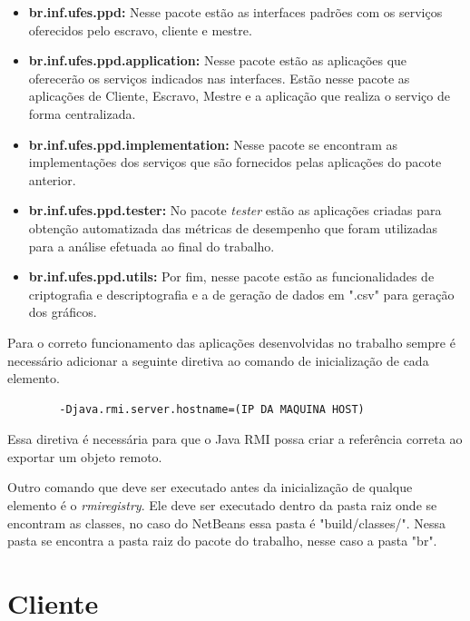 \documentclass[
	12pt,				%
    oneside,			%
	a4paper,			%
	english,			%
	brazil,				%
	]{abntex2}
\begin{document}
\begin{itemize}

	\item \textbf{br.inf.ufes.ppd:} Nesse pacote estão as interfaces padrões com os serviços oferecidos pelo escravo,
	cliente e mestre.
	
	\item \textbf{br.inf.ufes.ppd.application:} Nesse pacote estão as aplicações que oferecerão os serviços indicados nas  
	interfaces. Estão nesse pacote as aplicações de Cliente, Escravo, Mestre e a aplicação que realiza o serviço de forma
	centralizada.

	\item \textbf{br.inf.ufes.ppd.implementation:} Nesse pacote se encontram as implementações dos serviços que são 
	fornecidos pelas aplicações do pacote anterior.
	
	\item \textbf{br.inf.ufes.ppd.tester:} No pacote \textit{tester} estão as aplicações criadas para obtenção automatizada
	das 	métricas de desempenho que foram utilizadas para a análise efetuada ao final do trabalho.
	
	\item \textbf{br.inf.ufes.ppd.utils:} Por fim, nesse pacote estão as funcionalidades de criptografia e descriptografia e 
	a de geração de dados em ".csv" para geração dos gráficos.
		

\end{itemize}

Para o correto funcionamento das aplicações desenvolvidas no trabalho sempre é necessário adicionar a seguinte diretiva ao comando de inicialização de cada elemento.

\begin{center}
	\begin{lstlisting}
		-Djava.rmi.server.hostname=(IP DA MAQUINA HOST)\end{lstlisting}
\end{center}

Essa diretiva é necessária para que o Java RMI possa criar a referência correta ao exportar um objeto remoto. 

Outro comando que deve ser executado antes da inicialização de qualque elemento é o \textit{rmiregistry}. Ele deve ser
executado dentro da pasta raiz onde se encontram as classes, no caso do NetBeans essa pasta é "build/classes/".
Nessa pasta se encontra a pasta raiz do pacote do trabalho, nesse caso a pasta "br".

\section{Cliente}
\end{document}
